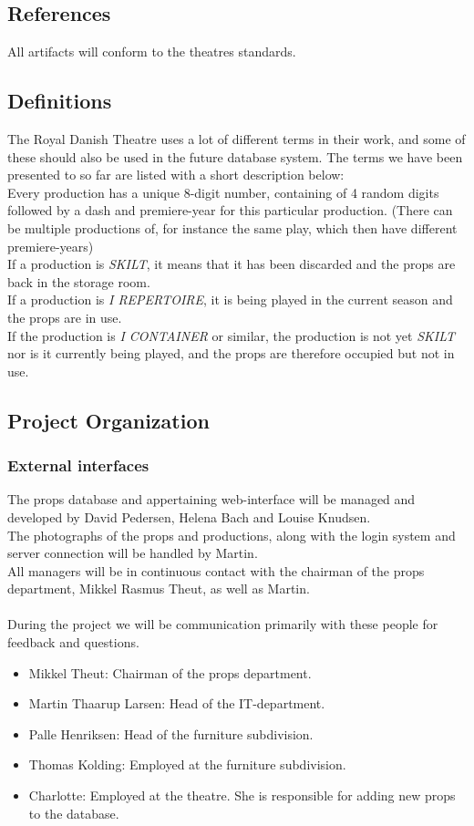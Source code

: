 \documentclass[12pt]{article}
\begin{document}
\subsection{References}
All artifacts will conform to the theatres standards.
\subsection{Definitions}
The Royal Danish Theatre uses a lot of different terms in their work, and some of these should also be used in the future database system. The terms we have been presented to so far are listed with a short description below: \\
Every production has a unique 8-digit number, containing of 4 random digits followed by a dash and premiere-year for this particular production. (There can be multiple productions of, for instance the same play, which then have different premiere-years) \\
If a production is \textit{SKILT}, it means that it has been discarded and the props are back in the storage room. \\
If a production is \textit{I REPERTOIRE}, it is being played in the current season and the props are in use. \\
If the production is \textit{I CONTAINER} or similar, the production is not yet \textit{SKILT} nor is it currently being played, and the props are therefore occupied but not in use.
\subsection{Project Organization}
\subsubsection{External interfaces}
The props database and appertaining web-interface will be managed and developed by David Pedersen, Helena Bach and Louise Knudsen. \\
The photographs of the props and productions, along with the login system and server connection will be handled by Martin. \\
All managers will be in continuous contact with the chairman of the props department, Mikkel Rasmus Theut, as well as Martin.\\\\
During the project we will be communication primarily with these people for feedback and questions.
\begin{itemize}
  \item Mikkel Theut: Chairman of the props department.
  \item Martin Thaarup Larsen: Head of the IT-department.
  \item Palle Henriksen: Head of the furniture subdivision.
  \item Thomas Kolding: Employed at the furniture subdivision.
  \item Charlotte: Employed at the theatre. She is responsible for adding new props to the database.
\end{itemize}
\end{document}
